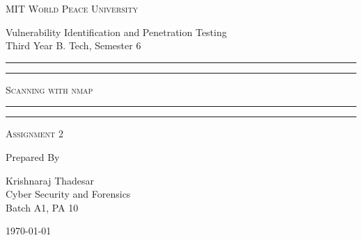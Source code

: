 \documentclass[11pt]{article}
\begin{document}
\begin{titlepage}
    \centering


    \huge\textsc{
        MIT World Peace University
    }\\

    \vspace{0.75\baselineskip} %

    \LARGE{
        Vulnerability Identification and Penetration Testing\\
        Third Year B. Tech, Semester 6
    }

    \vfill %


    \rule{\textwidth}{1.6pt}\vspace*{-\baselineskip}\vspace*{2pt}
    \rule{\textwidth}{0.6pt}
    \vspace{0.75\baselineskip} %



    \huge{\textsc{
            Scanning with nmap
        }} \\



    \vspace{0.5\baselineskip} %
    \rule{\textwidth}{0.6pt}\vspace*{-\baselineskip}\vspace*{2.8pt}
    \rule{\textwidth}{1.6pt}

    \vspace{1\baselineskip} %


    \LARGE\textsc{
        Assignment 2
    } %
    \vfill


    Prepared By
    \vspace{0.5\baselineskip} %

    \Large{
        Krishnaraj Thadesar \\
        Cyber Security and Forensics\\
        Batch A1, PA 10
    }


    \vspace{0.5\baselineskip} %
    \today

\end{titlepage}
\end{document}
